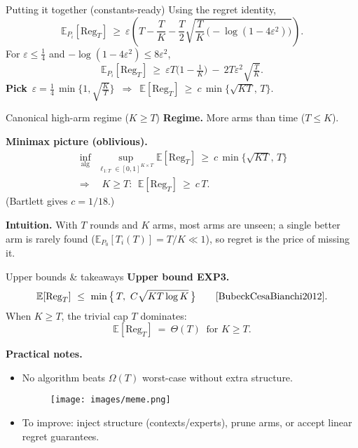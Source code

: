 \documentclass{beamer}
\newcommand{\E}{\mathbb{E}}
\newcommand{\Reg}{\mathrm{Reg}}
\begin{document}
\begin{frame}{Putting it together (constants-ready)}
  Using the regret identity,
  \[
    \E_{P_i}[\Reg_T]\ \ge\
    \varepsilon \left(
    T-\frac{T}{K}-\frac{T}{2}\sqrt{\frac{T}{K}\,\big(-\log(1-4\varepsilon^2)\big)}
    \right).
  \]
  For $\varepsilon\le\tfrac14$ and $-\log(1-4\varepsilon^2)\le 8\varepsilon^2$,
  \[
    \E_{P_i}[\Reg_T]\ \ge\ \varepsilon T\Big(1-\tfrac1K\Big)\ -\ 2T\varepsilon^2\sqrt{\tfrac{T}{K}}.
  \]
  \textbf{Pick}\ \(
  \displaystyle \varepsilon=\frac14\,\min\Big\{1,\sqrt{\tfrac{K}{T}}\Big\}
  \)\ \(\Rightarrow\)\
  \(
  \E[\Reg_T]\ \ge\ c\,\min\{\sqrt{KT},\,T\}.
  \)
\end{frame}


\begin{frame}{Canonical high-arm regime ($K \ge T$)}
  \textbf{Regime.} More arms than time ($T \le K$).

  \medskip
  \textbf{Minimax picture (oblivious).}
  \begin{align*}
    \inf_{\text{alg}}\ \sup_{\ell_{1:T}\in[0,1]^{K\times T}} \E[\Reg_T]
    \ \ge\ c\,\min\{\sqrt{KT},\,T\}
    \\ \Rightarrow\quad
    K \ge T:\ \ \E[\Reg_T]\ \ge\ c\,T.
  \end{align*}
  (Bartlett gives $c=1/18$.) \cite{BartlettAdvBandits}

  \medskip
  \textbf{Intuition.} With $T$ rounds and $K$ arms, most arms are unseen; a single better arm is rarely found
  ($\E_{P_0}[T_i(T)]=T/K\ll 1$), so regret is the price of missing it.
\end{frame}


\begin{frame}{Upper bounds \& takeaways}
  \textbf{Upper bound EXP3.}
  \[
    \E[\Reg_T]\ \le\ \min \big\{\,T,\ C\sqrt{KT\log K}\,\big\} \qquad \text{\cite{BubeckCesaBianchi2012}}.
  \]
  When $K \ge T$, the trivial cap $T$ dominates:
  \[
    \boxed{\ \E[\Reg_T]\ =\ \Theta(T)\ \text{ for } K \ge T. \ }
  \]

  \medskip
  \textbf{Practical notes.}
  \begin{itemize}
    \item No algorithm beats $\Omega(T)$ worst-case without extra structure. \\
      \begin{figure}
        \centering
        \texttt{[image: images/meme.png]}
      \end{figure}
    \item To improve: inject structure (contexts/experts), prune arms, or accept linear regret guarantees.
  \end{itemize}

\end{frame}
\end{document}
